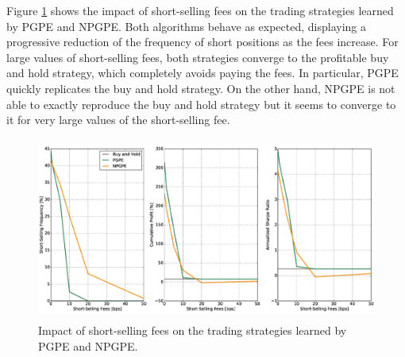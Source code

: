Figure \ref{fig:impact_short_selling_fees} shows the impact of short-selling fees on the trading strategies learned by PGPE and NPGPE. Both algorithms behave as expected, displaying a progressive reduction of the frequency of short positions as the fees increase. For large values of short-selling fees, both strategies converge to the profitable buy and hold strategy, which completely avoids paying the fees. In particular, PGPE quickly replicates the buy and hold strategy. On the other hand, NPGPE is not able to exactly reproduce the buy and hold strategy but it seems to converge to it for very large values of the short-selling fee. 
\begin{figure}[t!]
	\centering
	\includegraphics[height=6cm,width=1.0\textwidth]{Images/6_3_impact_short_selling_fees}
	\caption[Short-selling fees and risk-neutral strategies]{Impact of short-selling fees on the trading strategies learned by PGPE and NPGPE.}
	\label{fig:impact_short_selling_fees}
\end{figure}

